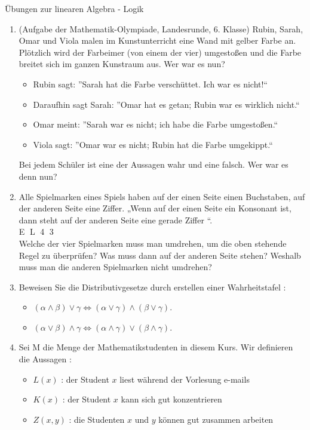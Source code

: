\documentclass[a4paper]{article}
\begin{document}
Übungen zur linearen Algebra - Logik
\begin{enumerate}
\item (Aufgabe der Mathematik-Olympiade, Landesrunde, 6. Klasse)
Rubin, Sarah, Omar und Viola malen im Kunstunterricht eine
Wand mit gelber Farbe an. Plötzlich wird der Farbeimer (von
einem der vier) umgestoßen und die Farbe breitet sich im ganzen
Kunstraum aus. Wer war es nun?
\begin{itemize}
\item Rubin sagt: ”Sarah hat die Farbe verschüttet. Ich war es nicht!“
\item Daraufhin sagt Sarah: ”Omar hat es getan; Rubin war es
wirklich nicht.“
\item Omar meint: ”Sarah war es nicht; ich habe die Farbe
umgestoßen.“
\item Viola sagt: ”Omar war es nicht; Rubin hat die Farbe
umgekippt.“
\end{itemize}
Bei jedem Schüler ist eine der Aussagen wahr und eine falsch.
Wer war es denn nun?
\item Alle Spielmarken eines Spiels haben auf der einen Seite einen
Buchstaben, auf der anderen Seite eine Ziffer. „Wenn auf der
einen Seite ein Konsonant ist, dann steht auf der anderen Seite
eine gerade Ziffer “. \\
\textcircled{E} \textcircled{L} \textcircled{4} \textcircled{3}\\
Welche der vier Spielmarken muss man umdrehen, um die oben
stehende Regel zu überprüfen? Was muss dann auf der anderen
Seite stehen? Weshalb muss man die anderen Spielmarken nicht
umdrehen? 
\item Beweisen Sie die Distributivgesetze durch erstellen einer Wahrheitstafel : 
\begin{itemize}
\item $(\alpha \wedge \beta) \vee \gamma \iff (\alpha \vee \gamma) \wedge (\beta \vee \gamma)$.
\item $(\alpha \vee \beta) \wedge \gamma \iff (\alpha \wedge \gamma) \vee (\beta \wedge \gamma)$.
\end{itemize}
\item Sei M die Menge der Mathematikstudenten in diesem Kurs. Wir definieren die Aussagen : 
\begin{itemize}
\item $L(x)$ : der Student $x$ liest während der Vorlesung e-mails
\item $K(x)$ : der Student $x$ kann sich gut konzentrieren 
\item $Z(x,y)$ : die Studenten $x$ und $y$ können gut zusammen arbeiten

\end{itemize}
\end{enumerate}
\end{document}
